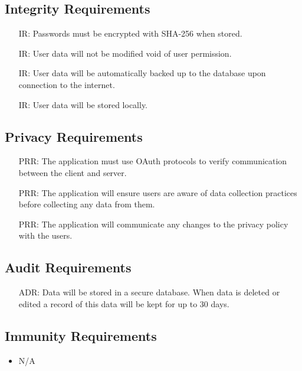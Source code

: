 \documentclass{article}
\newcounter{IRnum}
\newcounter{PRRnum}
\newcounter{ADRnum}
\begin{document}
	\subsection{Integrity Requirements}
	\noindent 
	\begin{itemize}
		\item[IR\refstepcounter{IRnum}\theIRnum:]
		Passwords must be encrypted with SHA-256 when stored.
		\item[IR\refstepcounter{IRnum}\theIRnum:]
		User data will not be modified void of user permission.
		\item[IR\refstepcounter{IRnum}\theIRnum:]
		User data will be automatically backed up to the database upon connection to the internet.
		\item[IR\refstepcounter{IRnum}\theIRnum:]
		User data will be stored locally.
	\end{itemize}
	\subsection{Privacy Requirements}
	\noindent 
	\begin{itemize}
		\item[PRR\refstepcounter{PRRnum}\thePRRnum:]
		The application must use OAuth protocols to verify communication between the client and server.
		\item[PRR\refstepcounter{PRRnum}\thePRRnum:]
		The application will ensure users are aware of data collection practices before collecting any data from them.
		\item[PRR\refstepcounter{PRRnum}\thePRRnum:]
		The application will communicate any changes to the privacy policy with the users.	
	\end{itemize}
	\subsection{Audit Requirements}
	\noindent
	\begin{itemize}
		\item[ADR\refstepcounter{ADRnum}\theADRnum:]
		Data will be stored in a secure database. When data is deleted or edited a record of this data will be kept for up to 30 days.
	\end{itemize}
	\subsection{Immunity Requirements}
	\noindent 
	\begin{itemize}
		\item N/A
	\end{itemize}
	
\end{document}
